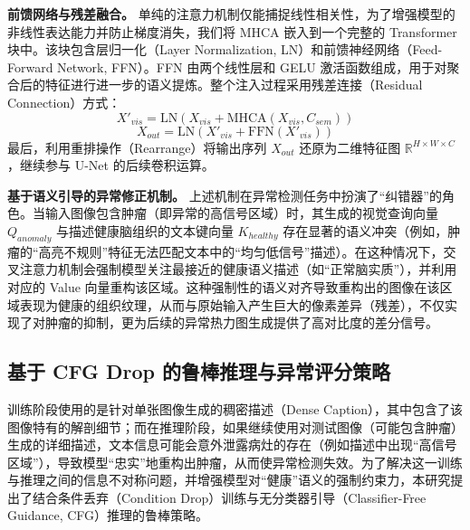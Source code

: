 \documentclass[Win]{xjtuBSThesis}  %
\begin{document}
\textbf{前馈网络与残差融合。} 
单纯的注意力机制仅能捕捉线性相关性，为了增强模型的非线性表达能力并防止梯度消失，我们将 MHCA 嵌入到一个完整的 Transformer 块中。该块包含层归一化（Layer Normalization, LN）和前馈神经网络（Feed-Forward Network, FFN）。FFN 由两个线性层和 GELU 激活函数组成，用于对聚合后的特征进行进一步的语义提炼。整个注入过程采用残差连接（Residual Connection）方式：
\begin{equation}
    X'_{vis} = \text{LN}(X_{vis} + \text{MHCA}(X_{vis}, C_{sem}))
\end{equation}
\begin{equation}
    X_{out} = \text{LN}(X'_{vis} + \text{FFN}(X'_{vis}))
\end{equation}
最后，利用重排操作（Rearrange）将输出序列 $X_{out}$ 还原为二维特征图 $\mathbb{R}^{H \times W \times C}$，继续参与 U-Net 的后续卷积运算。

\textbf{基于语义引导的异常修正机制。} 
上述机制在异常检测任务中扮演了“纠错器”的角色。当输入图像包含肿瘤（即异常的高信号区域）时，其生成的视觉查询向量 $Q_{anomaly}$ 与描述健康脑组织的文本键向量 $K_{healthy}$ 存在显著的语义冲突（例如，肿瘤的“高亮不规则”特征无法匹配文本中的“均匀低信号”描述）。在这种情况下，交叉注意力机制会强制模型关注最接近的健康语义描述（如“正常脑实质”），并利用对应的 Value 向量重构该区域。这种强制性的语义对齐导致重构出的图像在该区域表现为健康的组织纹理，从而与原始输入产生巨大的像素差异（残差），不仅实现了对肿瘤的抑制，更为后续的异常热力图生成提供了高对比度的差分信号。




\subsection{基于 CFG Drop 的鲁棒推理与异常评分策略}
\label{subsec:cfg_drop}

训练阶段使用的是针对单张图像生成的稠密描述（Dense Caption），其中包含了该图像特有的解剖细节；而在推理阶段，如果继续使用对测试图像（可能包含肿瘤）生成的详细描述，文本信息可能会意外泄露病灶的存在（例如描述中出现“高信号区域”），导致模型“忠实”地重构出肿瘤，从而使异常检测失效。为了解决这一训练与推理之间的信息不对称问题，并增强模型对“健康”语义的强制约束力，本研究提出了结合条件丢弃（Condition Drop）训练与无分类器引导（Classifier-Free Guidance, CFG）推理的鲁棒策略。
\end{document}

